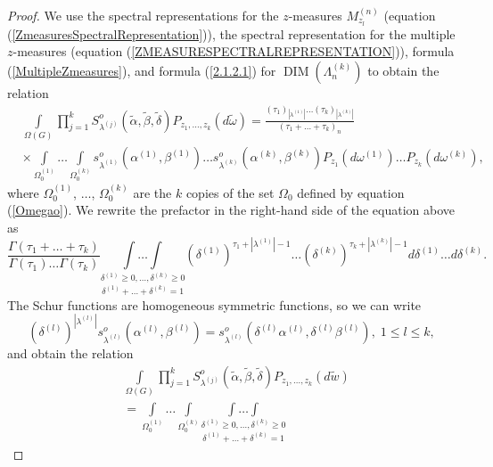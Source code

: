 \documentclass[12pt]{amsart}
\theoremstyle{definition}
\numberwithin{equation}{section}
\DeclareMathOperator{\DIM}{DIM}
\begin{document}
\begin{proof}
We use the spectral representations for the $z$-measures $M_{z_l}^{(n)}$  (equation (\ref{ZmeasuresSpectralRepresentation})), the spectral representation for the multiple $z$-measures (equation (\ref{ZMEASURESPECTRALREPRESENTATION})), formula (\ref{MultipleZmeasures}), and formula (\ref{2.1.2.1})
for $\DIM\left(\Lambda_n^{(k)}\right)$ to obtain the relation
\begin{equation}
\begin{split}
&\int\limits_{\Omega(G)}\prod\limits_{j=1}^k
S_{\lambda^{(j)}}^{o}\left(\tilde{\alpha},\tilde{\beta},\tilde{\delta}\right)P_{z_1,\ldots,z_k}\left(d\tilde{\omega}\right)=\frac{\left(\tau_1\right)_{|\lambda^{(1)}|}\ldots \left(\tau_k\right)_{|\lambda^{(k)}|}}{\left(\tau_1+\ldots+\tau_k\right)_n}\\
&\times
\int\limits_{\Omega_0^{(1)}}\ldots\int\limits_{\Omega_0^{(k)}}
s_{\lambda^{(1)}}^{o}\left(\alpha^{(1)},\beta^{(1)}\right)\ldots s_{\lambda^{(k)}}^{o}
\left(\alpha^{(k)},\beta^{(k)}\right)P_{z_1}\left(d\omega^{(1)}\right)\ldots
P_{z_k}\left(d\omega^{(k)}\right),
\end{split}
\end{equation}
where $\Omega^{(1)}_0$, $\ldots$, $\Omega^{(k)}_0$ are the $k$ copies of the set $\Omega_0$ defined by equation
(\ref{Omegao}).
We rewrite the prefactor in the right-hand side of the equation above as
$$
\frac{\Gamma\left(\tau_1+\ldots+\tau_k\right)}{\Gamma\left(\tau_1\right)\ldots\Gamma\left(\tau_k\right)}
\underset{\delta^{(1)}+\ldots+\delta^{(k)}=1}{\underset{\delta^{(1)}\geq 0,\ldots, \delta^{(k)}\geq 0}{\int\ldots\int}}
\left(\delta^{(1)}\right)^{\tau_1+|\lambda^{(1)}|-1}\ldots
\left(\delta^{(k)}\right)^{\tau_k+|\lambda^{(k)}|-1}d\delta^{(1)}\ldots d\delta^{(k)}.
$$
The Schur functions are homogeneous symmetric functions, so we can write
$$
\left(\delta^{(l)}\right)^{|\lambda^{(l)}|}s_{\lambda^{(l)}}^{o}\left(\alpha^{(l)},\beta^{(l)}\right)
=s_{\lambda^{(l)}}^{o}\left(\delta^{(l)}\alpha^{(l)},\delta^{(l)}\beta^{(l)}\right),\; 1\leq l\leq k,
$$
and  obtain the relation
\begin{equation}\label{RelationSpectralZ}
\begin{split}
&\int\limits_{\Omega(G)}\prod\limits_{j=1}^kS_{\lambda^{(j)}}^{o}\left(\tilde{\alpha},\tilde{\beta},\tilde{\delta}\right)P_{z_1,\ldots,z_k}\left(d\tilde{w}\right)\\
&=
\int\limits_{\Omega_0^{(1)}}\ldots\int\limits_{\Omega_0^{(k)}}
\underset{\delta^{(1)}+\ldots+\delta^{(k)}=1}{\underset{\delta^{(1)}\geq 0,\ldots, \delta^{(k)}\geq 0}{\int\ldots\int}}

\end{split}
\end{equation}
\end{proof}
\end{document}
